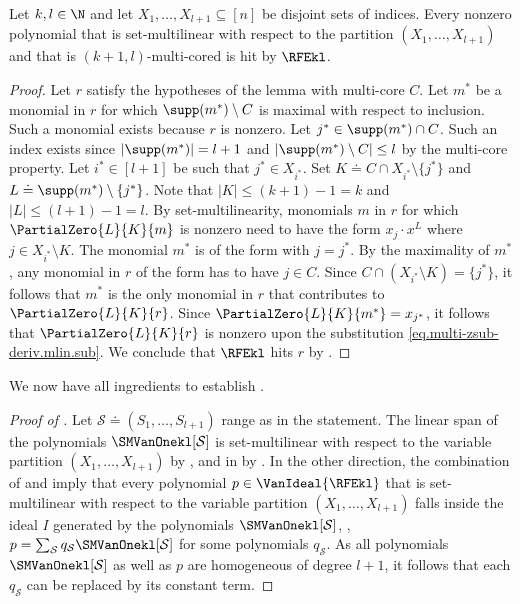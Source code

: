 \begin{lemma}
  \label{lemma.rfe-hits-multicored}
  Let \(k,l\in \N\) 
  and let \(X_1, \dots, X_{l+1} \subseteq [n]\) be disjoint sets of indices.
  Every nonzero polynomial that is set-multilinear with respect to
  the partition $(X_1,\dots,X_{l+1})$ and that is \((k+1,l)\)-multi-cored
  is hit by \(\RFEkl\).
\end{lemma}

\begin{proof}
  Let $r$ satisfy the hypotheses of the lemma with multi-core $C$. Let $m^*$ be a monomial in $r$ for which $\supp(m^*) \setminus C$ is maximal with respect to inclusion. Such a monomial exists because $r$ is nonzero. Let $j^* \in \supp(m^*) \cap C$. Such an index exists since $|\supp(m^*)|=l+1$ and $|\supp(m^*) \setminus C| \le l$ by the multi-core property. Let $i^* \in [l+1]$ be such that $j^* \in X_{i^*}$. Set $K \doteq C \cap X_{i^*} \setminus \{j^*\}$ and $L \doteq \supp(m^*) \setminus \{j^*\}$. Note that $|K| \le (k+1)-1=k$ and $|L| \le (l+1)-1=l$. By set-multilinearity, monomials $m$ in $r$ for which \(\PartialZero{L}{K}{m}\) is nonzero need to have the form $x_j \cdot x^L$ where $j \in X_{i^*} \setminus K$. The monomial $m^*$ is of the form with $j=j^*$. By the maximality of $m^*$, any monomial in $r$ of the form has to have $j \in C$. Since $C \cap (X_{i^*} \setminus K) = \{j^*\}$, it follows that $m^*$ is the only monomial in $r$ that contributes to $\PartialZero{L}{K}{r}$. Since $\PartialZero{L}{K}{m^*} = x_{j^*}$, it follows that 
  $\PartialZero{L}{K}{r}$ is nonzero upon the substitution
  \eqref{eq.multi-zsub-deriv.mlin.sub}. We conclude that \(\RFEkl\) hits $r$ by .
\end{proof}

We now have all ingredients to establish . 

\begin{proof}[Proof of ]
    Let $\mathcal{S} \doteq (S_1, \dots, S_{l+1})$ range as in the statement. The linear span of the polynomials $\SMVanOnekl[\mathcal{S}]$ is set-multilinear with respect to the variable partition $(X_1, \dots, X_{l+1})$ by , and in \VanIdeal{\RFEkl} by 
    . 
    In the other direction, the combination of  and  imply that every polynomial $p \in \VanIdeal{\RFEkl}$ that is set-multilinear with respect to the variable partition $(X_1, \dots, X_{l+1})$ falls inside the ideal $I$ generated by the polynomials $\SMVanOnekl[\mathcal{S}]$, \ie, $p = \sum_{\mathcal{S}} q_{\mathcal{S}} \SMVanOnekl[\mathcal{S}]$ for some polynomials $q_{\mathcal{S}}$.
    As all polynomials $\SMVanOnekl[\mathcal{S}]$ as well as $p$ are homogeneous of degree $l+1$, it follows that each $q_{\mathcal{S}}$ can be replaced by its constant term. 
\end{proof}



